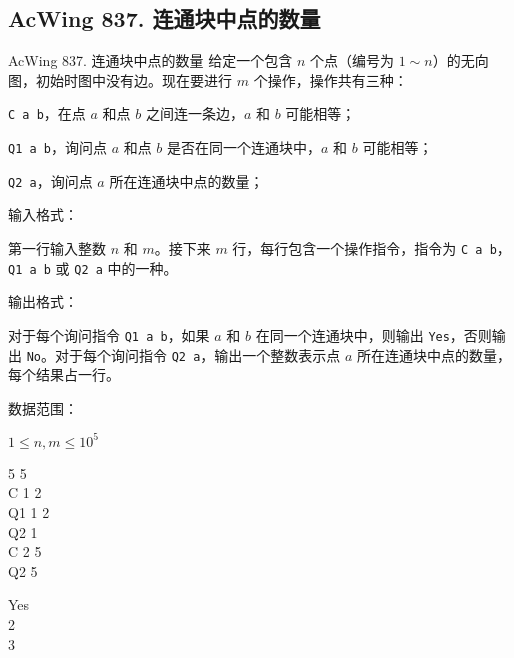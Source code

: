 \subsection{AcWing 837. 连通块中点的数量}

\begin{titledbox}{AcWing 837. 连通块中点的数量}
给定一个包含 $n$ 个点（编号为 $1 \sim n$）的无向图，初始时图中没有边。现在要进行 $m$ 个操作，操作共有三种：

\lstinline{C a b}，在点 $a$ 和点 $b$ 之间连一条边，$a$ 和 $b$ 可能相等；

\lstinline{Q1 a b}，询问点 $a$ 和点 $b$ 是否在同一个连通块中，$a$ 和 $b$ 可能相等；

\lstinline{Q2 a}，询问点 $a$ 所在连通块中点的数量；

输入格式：

第一行输入整数 $n$ 和 $m$。接下来 $m$ 行，每行包含一个操作指令，指令为 \lstinline{C a b}，\lstinline{Q1 a b} 或 \lstinline{Q2 a} 中的一种。

输出格式：

对于每个询问指令 \lstinline{Q1 a b}，如果 $a$ 和 $b$ 在同一个连通块中，则输出 \lstinline{Yes}，否则输出 \lstinline{No}。对于每个询问指令 \lstinline{Q2 a}，输出一个整数表示点 $a$ 所在连通块中点的数量，每个结果占一行。

数据范围：

$1 \le n,m \le 10^5$
    
\begin{inputblock}
    5 5 \\
    C 1 2 \\
    Q1 1 2 \\
    Q2 1 \\
    C 2 5 \\
    Q2 5
\end{inputblock}
\begin{outputblock}
    Yes \\
    2 \\
    3
\end{outputblock}
\end{titledbox}

